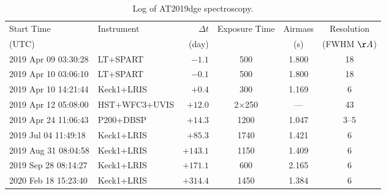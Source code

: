 \begin{table*}
	\caption{Log of AT2019dge spectroscopy. \label{tab:spec}}
	\centering
	\begin{tabular}{llrccc}
	\toprule
	Start Time  & Instrument & $\Delta t$& Exposure Time & Airmass & Resolution\\
	(UTC) & & (day)& & (s)& (FWHM $\AA$)\\
	\midrule
	2019 Apr 09 03:30:28 & LT+SPART  & $-1.1$&  500   & 1.800 & 18 \\
	2019 Apr 10 03:06:10 & LT+SPART & $-0.1$ &  500   & 1.800 & 18 \\
	2019 Apr 10 14:21:44 & Keck1+LRIS & $+0.4$ & 300 & 1.169 & 6 \\
	2019 Apr 12 05:08:00 & HST+WFC3+UVIS & $+12.0$& 2$\times$250 & --- & 43\\
	2019 Apr 24 11:06:43 & P200+DBSP & $+14.3$& 1200 & 1.047 & 3--5\\
	2019 Jul 04 11:49:18   & Keck1+LRIS & $+85.3$& 1740 & 1.421 & 6\\
	2019 Aug 31 08:04:58   & Keck1+LRIS &$+143.1$ & 1150 & 1.409 & 6  \\
	2019 Sep 28 08:14:27   & Keck1+LRIS & $+171.1$& 600 & 2.165 & 6\\
	2020 Feb 18 15:23:40   & Keck1+LRIS & $+314.4$& 1450 & 1.384 & 6\\
	\bottomrule
\end{tabular}
\end{table*}
